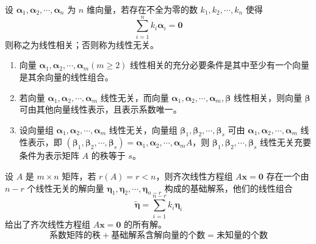 \documentclass{ctexbook}
\begin{document}
\begin{definition}[线性相关]
    设 $\boldsymbol{\alpha}_1,\boldsymbol{\alpha}_2,\cdots,\boldsymbol{\alpha}_n$ 为 $n$ 维向量，若存在不全为零的数 $k_1,k_2,\cdots,k_n$ 使得
    \begin{equation}
        \sum_{i=1}^n k_i\boldsymbol{\alpha}_i = \boldsymbol{0}
    \end{equation}
    则称之为线性相关；否则称为线性无关。
\end{definition}

\begin{theorem}[线性相关定理]
    \begin{enumerate}
        \item 向量 $\boldsymbol{\alpha}_1,\boldsymbol{\alpha}_2,\cdots,\boldsymbol{\alpha}_m(m\geq 2)$ 线性相关的充分必要条件是其中至少有一个向量是其余向量的线性组合。
        \item 若向量 $\boldsymbol{\alpha}_1,\boldsymbol{\alpha}_2,\cdots,\boldsymbol{\alpha}_m$ 线性无关，而向量 $\boldsymbol{\alpha}_1,\boldsymbol{\alpha}_2,\cdots,\boldsymbol{\alpha}_m,\boldsymbol{\beta}$ 线性相关，则向量 $\boldsymbol{\beta}$ 可由其他向量线性表示，且表示系数唯一。
        \item 设向量组 $\boldsymbol{\alpha}_1, \boldsymbol{\alpha}_2, \cdots, \boldsymbol{\alpha}_m$ 线性无关，向量组 $\boldsymbol{\beta}_1,\boldsymbol{\beta}_2,\cdots,\boldsymbol{\beta}_s$ 可由 $\boldsymbol{\alpha}_1,\boldsymbol{\alpha}_2,\cdots,\boldsymbol{\alpha}_m$ 线性表示，即 $(\boldsymbol{\beta}_1,\boldsymbol{\beta}_2,\cdots,\boldsymbol{\beta}_s)=\boldsymbol{\alpha}_1,\boldsymbol{\alpha}_2,\cdots,\boldsymbol{\alpha}_m A$，则 $\boldsymbol{\beta}_1,\boldsymbol{\beta}_2,\cdots,\boldsymbol{\beta}_s$ 线性无关充要条件为表示矩阵 $A$ 的秩等于 $s$。
    \end{enumerate}
\end{theorem}

\begin{definition}[基础解系]
    设 $A$ 是 $m\times n$ 矩阵，若 $r(A)=r<n$，则齐次线性方程组 $A\boldsymbol{x}=\boldsymbol{0}$ 存在一个由 $n-r$ 个线性无关的解向量 $\boldsymbol{\eta}_1,\boldsymbol{\eta}_2,\cdots,\boldsymbol{\eta}_{n-r}$ 构成的基础解系，他们的线性组合
    \begin{equation}
        \tilde{\boldsymbol{\eta}}=\sum_{i=1}^{n-r}k_i\boldsymbol{\eta}_i
    \end{equation}
    给出了齐次线性方程组 $A\boldsymbol{x}=\boldsymbol{0}$ 的所有解。
    \begin{equation}
        \text{系数矩阵的秩}+\text{基础解系含解向量的个数}=\text{未知量的个数}
    \end{equation}
\end{definition}
\end{document}

